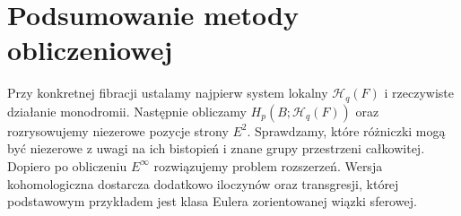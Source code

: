 \section{Podsumowanie metody obliczeniowej}
Przy konkretnej fibracji ustalamy najpierw system lokalny
$\mathcal H_q(F)$ i rzeczywiste działanie monodromii.
Następnie obliczamy $H_p(B;\mathcal H_q(F))$ oraz
rozrysowujemy niezerowe pozycje strony $E^2$.
Sprawdzamy, które różniczki mogą być niezerowe z uwagi
na ich bistopień i znane grupy przestrzeni całkowitej.
Dopiero po obliczeniu $E^\infty$ rozwiązujemy problem
rozszerzeń. Wersja kohomologiczna dostarcza dodatkowo
iloczynów oraz transgresji, której podstawowym przykładem
jest klasa Eulera zorientowanej wiązki sferowej.
\clearpage


